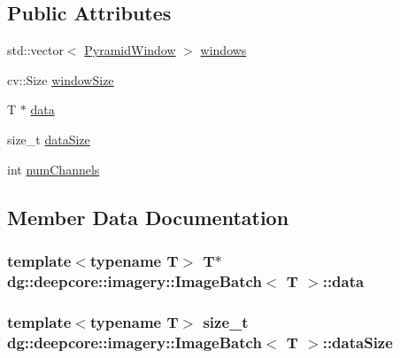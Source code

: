 \subsection*{Public Attributes}
\begin{DoxyCompactItemize}
\item 
std\+::vector$<$ \hyperlink{structdg_1_1deepcore_1_1imagery_1_1_pyramid_window}{Pyramid\+Window} $>$ \hyperlink{structdg_1_1deepcore_1_1imagery_1_1_image_batch_aaad6b20c2ef1174aa8f76316de2f3346}{windows}
\item 
cv\+::\+Size \hyperlink{structdg_1_1deepcore_1_1imagery_1_1_image_batch_a7aa70055515ba469802a87e84a55b126}{window\+Size}
\item 
T $\ast$ \hyperlink{structdg_1_1deepcore_1_1imagery_1_1_image_batch_a796462f273b731f121263a3673c5c58c}{data}
\item 
size\+\_\+t \hyperlink{structdg_1_1deepcore_1_1imagery_1_1_image_batch_ab09934cee7a93fb7477e28f216fe33ac}{data\+Size}
\item 
int \hyperlink{structdg_1_1deepcore_1_1imagery_1_1_image_batch_a80cbef4587861d99294c5ca3ee0e7aec}{num\+Channels}
\end{DoxyCompactItemize}


\subsection{Member Data Documentation}
\subsubsection[{\texorpdfstring{data}{data}}]{\setlength{\rightskip}{0pt plus 5cm}template$<$typename T$>$ T$\ast$ {\bf dg\+::deepcore\+::imagery\+::\+Image\+Batch}$<$ T $>$\+::data}\hypertarget{structdg_1_1deepcore_1_1imagery_1_1_image_batch_a796462f273b731f121263a3673c5c58c}{}\label{structdg_1_1deepcore_1_1imagery_1_1_image_batch_a796462f273b731f121263a3673c5c58c}
\subsubsection[{\texorpdfstring{data\+Size}{dataSize}}]{\setlength{\rightskip}{0pt plus 5cm}template$<$typename T$>$ size\+\_\+t {\bf dg\+::deepcore\+::imagery\+::\+Image\+Batch}$<$ T $>$\+::data\+Size}\hypertarget{structdg_1_1deepcore_1_1imagery_1_1_image_batch_ab09934cee7a93fb7477e28f216fe33ac}{}\label{structdg_1_1deepcore_1_1imagery_1_1_image_batch_ab09934cee7a93fb7477e28f216fe33ac}

